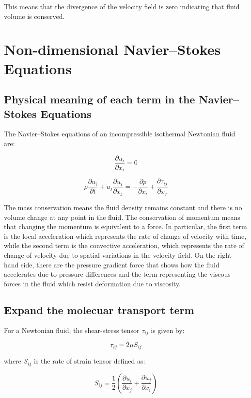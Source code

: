 \documentclass{article}
\begin{document}
This means that the divergence of the velocity field is zero indicating that fluid volume is conserved.

\section{Non-dimensional Navier–Stokes Equations}

\subsection{Physical meaning of each term in the Navier–Stokes Equations}
The Navier–Stokes equations of an incompressible isothermal Newtonian fluid are:

\begin{equation}
\frac{\partial u_i}{\partial x_i} = 0
\end{equation}

\begin{equation}
\rho \frac{\partial u_i}{\partial t} + u_j \frac{\partial u_i}{\partial x_j} = - \frac{\partial p}{\partial x_i} + \frac{\partial \tau_{ij}}{\partial x_j}
\end{equation}

The mass conservation means the fluid density remains constant and there is no volume change at any point in the fluid. The conservation of momentum means that changing the momentum is equivalent to a force. In particular, the first term is the local acceleration which represents the rate of change of velocity with time, while the second term is the convective acceleration, which represents the rate of change of velocity due to spatial variations in the velocity field. On the right-hand side, there are the pressure gradient force that shows how the fluid accelerates due to pressure differences and the term representing the viscous forces in the fluid which resist deformation due to viscosity.

\subsection{Expand the molecuar transport term}
For a Newtonian fluid, the shear-stress tensor $\tau_{ij}$ is given by:

\begin{equation}
\tau_{ij} = 2 \mu S_{ij}
\end{equation}

where $S_{ij}$ is the rate of strain tensor defined as:

\[
S_{ij} = \frac{1}{2} \left( \frac{\partial u_i}{\partial x_j} + \frac{\partial u_j}{\partial x_i} \right)
\]
\end{document}
